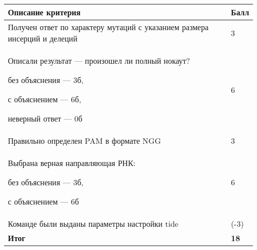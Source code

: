 \begin{tabular}{|p{11cm}|p{3cm}|}
    \hline
    \textbf{Описание критерия} & \textbf{Балл} \\
    \hline
    Получен ответ по характеру мутаций с указанием размера инсерций и делеций & 3 \\
    \hline
    Описали результат — произошел ли полный нокаут? 
    
    без объяснения — 3б, 
    
    с объяснением — 6б, 
    
    неверный ответ — 0б & 6 \\
    \hline
    Правильно определен PAM в формате NGG & 3 \\
    \hline
    Выбрана верная направляющая РНК: 
    
    без объяснения — 3б, 
    
    с объяснением — 6б & 6 \\
    \hline
    Команде были выданы параметры настройки tide & (-3) \\    
    \hline
    \hline
    \textbf{Итог} & \textbf{18} \\
    \hline
\end{tabular}
